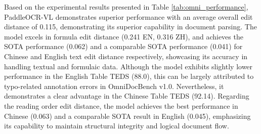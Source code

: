 \documentclass[11pt, a4paper,logo,  copyright, nonumbering]{paddleocr}
\begin{document}
Based on the experimental results presented in Table \ref{tab:omni_performance}, PaddleOCR-VL demonstrates superior performance with an average overall edit distance of 0.115, demonstrating its superior capability in document parsing. The model excels in formula edit distance (0.241 EN, 0.316 ZH), and achieves the SOTA performance (0.062) and a comparable SOTA performance (0.041) for Chinese and English text edit distance respectively, showcasing its accuracy in handling textual and formulaic data. Although the model exhibits slightly lower performance in the English Table TEDS (88.0), this can be largely attributed to typo-related annotation errors in OmniDocBench v1.0. Nevertheless, it demonstrates a clear advantage in the Chinese Table TEDS (92.14). Regarding the reading order edit distance, the model achieves the best performance in Chinese (0.063) and a comparable SOTA result in English (0.045), emphasizing its capability to maintain structural integrity and logical document flow.
\end{document}
